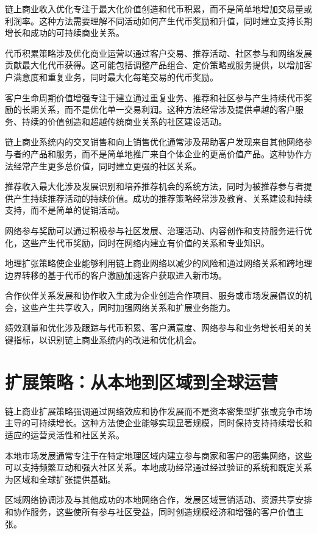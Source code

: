 \documentclass[
  Letterpaper,
]{scrbook}
\begin{document}
链上商业收入优化专注于最大化价值创造和代币积累，而不是简单地增加交易量或利润率。这种方法需要理解不同活动如何产生代币奖励和升值，同时建立支持长期增长和成功的可持续商业关系。

代币积累策略涉及优化商业运营以通过客户交易、推荐活动、社区参与和网络发展贡献最大化代币获得。这可能包括调整产品组合、定价策略或服务提供，以增加客户满意度和重复业务，同时最大化每笔交易的代币奖励。

客户生命周期价值增强专注于建立通过重复业务、推荐和社区参与产生持续代币奖励的长期关系，而不是优化单一交易利润。这种方法经常涉及提供卓越的客户服务、持续的价值创造和超越传统商业关系的社区建设活动。

链上商业系统内的交叉销售和向上销售优化通常涉及帮助客户发现来自其他网络参与者的产品和服务，而不是简单地推广来自个体企业的更高价值产品。这种协作方法经常产生更多总价值，同时建立更强的社区关系。

推荐收入最大化涉及发展识别和培养推荐机会的系统方法，同时为被推荐参与者提供产生持续推荐活动的持续价值。成功的推荐策略经常涉及教育、关系建设和持续支持，而不是简单的促销活动。

网络参与奖励可以通过积极参与社区发展、治理活动、内容创作和支持服务进行优化，这些产生代币奖励，同时在网络内建立有价值的关系和专业知识。

地理扩张策略使企业能够利用链上商业网络以减少的风险和通过网络关系和跨地理边界转移的基于代币的客户激励加速客户获取进入新市场。

合作伙伴关系发展和协作收入生成为企业创造合作项目、服务或市场发展倡议的机会，这些产生共享收入，同时加强网络关系和扩展业务能力。

绩效测量和优化涉及跟踪与代币积累、客户满意度、网络参与和业务增长相关的关键指标，以识别链上商业系统内的改进和优化机会。

\section{扩展策略：从本地到区域到全球运营}\label{ux6269ux5c55ux7b56ux7565ux4eceux672cux5730ux5230ux533aux57dfux5230ux5168ux7403ux8fd0ux8425}

链上商业扩展策略强调通过网络效应和协作发展而不是资本密集型扩张或竞争市场主导的可持续增长。这种方法使企业能够实现显著规模，同时保持支持持续增长和适应的运营灵活性和社区关系。

本地市场发展通常专注于在特定地理区域内建立参与商家和客户的密集网络，这些可以支持频繁互动和强大社区关系。本地成功经常通过经过验证的系统和既定关系为区域和全球扩张提供基础。

区域网络协调涉及与其他成功的本地网络合作，发展区域营销活动、资源共享安排和协作服务，这些使所有参与社区受益，同时创造规模经济和增强的客户价值主张。
\end{document}
